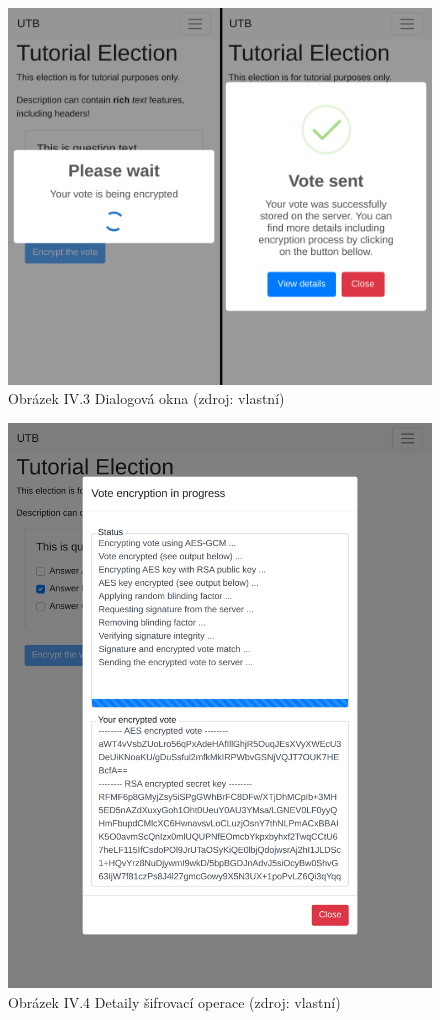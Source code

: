\begin{figure}[h]
	\centering
	\includegraphics[width=\linewidth]{graphics/attachements/volbyCompared2.png}
	\captionsetup{width=\linewidth}
	\caption*{Obrázek IV.3 Dialogová okna (zdroj: vlastní)}
\end{figure}

\begin{figure}[h]
	\centering
	\includegraphics[width=\linewidth]{graphics/attachements/volbyDetails.png}
	\captionsetup{width=\linewidth}
	\caption*{Obrázek IV.4 Detaily šifrovací operace (zdroj: vlastní)}
\end{figure}